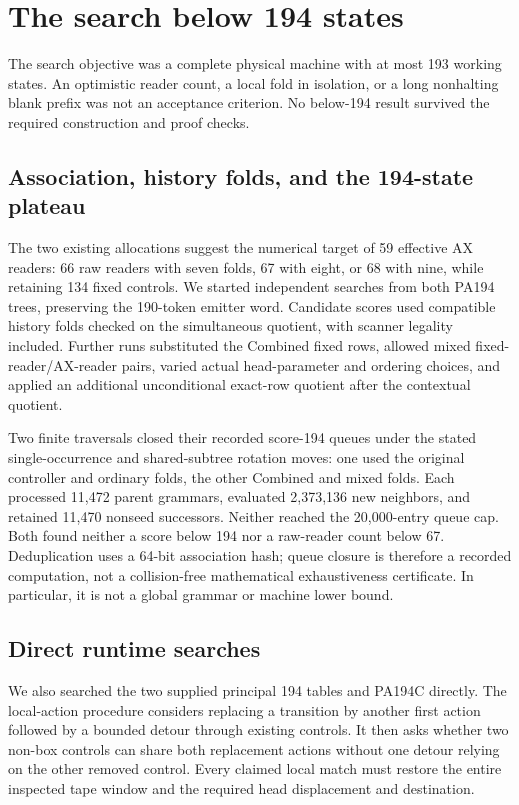 \section{The search below 194 states}
\label{sec:search}

The search objective was a complete physical machine with at most 193
working states. An optimistic reader count, a local fold in isolation,
or a long nonhalting blank prefix was not an acceptance criterion.
No below-194 result survived the required construction and proof checks.

\subsection{Association, history folds, and the 194-state plateau}

The two existing allocations suggest the numerical target of 59 effective
AX readers: 66 raw readers with seven folds, 67 with eight, or 68 with
nine, while retaining 134 fixed controls. We started independent searches
from both PA194 trees, preserving the 190-token emitter word. Candidate
scores used compatible history folds checked on the simultaneous quotient,
with scanner legality included. Further runs substituted the Combined
fixed rows, allowed mixed fixed-reader/AX-reader pairs, varied actual
head-parameter and ordering choices, and applied an additional unconditional
exact-row quotient after the contextual quotient.

Two finite traversals closed their recorded score-194 queues under the
stated single-occurrence and shared-subtree rotation moves: one used the
original controller and ordinary folds, the other Combined and mixed
folds. Each processed 11,472 parent grammars, evaluated 2,373,136 new
neighbors, and retained 11,470 nonseed successors. Neither reached the
20,000-entry queue cap. Both found neither a score below 194 nor a
raw-reader count below 67. Deduplication uses a 64-bit association hash;
queue closure is therefore a recorded computation, not a collision-free
mathematical exhaustiveness certificate. In particular, it is not a
global grammar or machine lower bound.



\subsection{Direct runtime searches}

We also searched the two supplied principal 194 tables and PA194C directly.
The local-action procedure considers replacing a transition by another
first action followed by a bounded detour through existing controls. It
then asks whether two non-box controls can share both replacement actions
without one detour relying on the other removed control. Every claimed
local match must restore the entire inspected tape window and the required
head displacement and destination.

